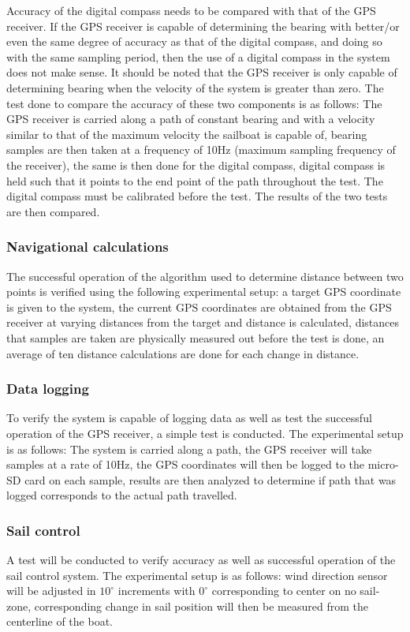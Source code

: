 Accuracy of the digital compass needs to be compared with that of the GPS receiver. If the GPS receiver is capable of determining the bearing with better/or 
even the same degree of accuracy as that of the digital compass, and doing so with the same sampling period, then the use of a digital compass in the 
system does not make sense. It should be noted that the GPS receiver is only capable of determining bearing when the velocity of the system is greater than
zero. The test done to compare the accuracy of these two components is as follows: The GPS receiver is carried along a path of constant bearing and with a 
velocity similar to that of the maximum velocity the sailboat is capable of, bearing samples are then taken at a frequency of 10Hz (maximum sampling frequency
of the receiver), the same is then done for the digital compass, digital compass is held such that it points to the end point of the path throughout 
the test. The digital compass must be calibrated before the test. The results of the two tests are then compared.  

\subsubsection{Navigational calculations}
The successful operation of the algorithm used to determine distance between two points is verified using the following experimental setup: a target GPS 
coordinate is given to the system, the current GPS coordinates are obtained from the GPS receiver at varying distances from the target and distance is 
calculated, distances that samples are taken are physically measured out before the test is done, an average of ten distance calculations are done for each
change in distance. 


\subsubsection{Data logging}
To verify the system is capable of logging data as well as test the successful operation of the GPS receiver, a simple test is conducted. The experimental 
setup is as follows: The system is carried along a path, the GPS receiver will take samples at a rate of 10Hz, the GPS coordinates will then be logged to 
the micro-SD card on each sample, results are then analyzed to determine if path that was logged corresponds to the actual path travelled. 

\subsubsection{Sail control}
A test will be conducted to verify accuracy as well as successful operation of the sail control system. The experimental setup is as follows: wind direction 
sensor will be adjusted in $10^{\circ}$ increments with $0^{\circ}$ corresponding to center on no sail-zone, corresponding change in sail position will then 
be measured from the centerline of the boat.

